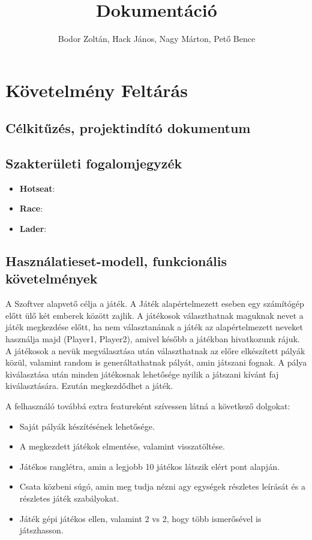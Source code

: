 \documentclass[a4paper,12pt]{report}
\title{Dokumentáció}
\author{Bodor Zoltán, Hack János, Nagy Márton, Pető Bence}
\begin{document}
\maketitle

%

\tableofcontents

\chapter{Követelmény Feltárás}

\section{Célkitűzés, projektindító dokumentum}

\section{Szakterületi fogalomjegyzék}

\begin{itemize}
\item {\bf Hotseat}:
\item {\bf Race}:
\item {\bf Lader}:
\end{itemize}

\section{Használatieset-modell, funkcionális követelmények}

A Szoftver alapvető célja a játék. A Játék alapértelmezett eseben egy számítógép előtt ülő két emberek között zajlik. A játékosok választhatnak maguknak nevet a játék megkezdése előtt,
ha nem választanának a játék az alapértelmezett neveket használja majd (Player1, Player2), amivel később a játékban hivatkozunk rájuk. A játékosok a nevük megválasztása után választhatnak az előre elkészített pályák közül, valamint random is generáltathatnak pályát, amin játszani fognak. A pálya kiválasztása után minden játékosnak
lehetősége nyilik a játszani kívánt faj kiválasztására. Ezután megkezdődhet a játék.

A felhasználó továbbá extra featureként szívessen látná a következő dolgokat:
\begin{itemize}
\item Saját pályák készítésének lehetősége.
\item A megkezdett játékok elmentése, valamint visszatöltése.
\item Játékos ranglétra, amin a legjobb 10 játékos látszik elért pont alapján.
\item Csata közbeni súgó, amin meg tudja nézni agy egységek részletes leírását és a részletes játék szabályokat.
\item Játék gépi játékos ellen, valamint 2 vs 2, hogy több ismerősével is játszhasson.
\end{itemize} 
\end{document}
